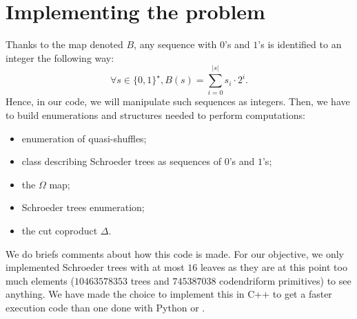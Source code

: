 \documentclass[a4paper,10pt]{amsart}
\newcommand{\Schw}{Schroeder} %
\theoremstyle{definition}
\begin{document}
\section{Implementing the problem} \label{sec:coding}
Thanks to the map denoted $B$, any sequence with $0$'s and $1$'s is identified to an integer the following way:
\[
\forall s\in \{0,1\}^{\star}, B(s)=\sum^{|s|}_{i=0} s_i\cdot 2^i.
\]
Hence, in our code, we will manipulate such sequences as integers. Then, we have to build enumerations and structures needed to perform computations:
\begin{itemize}
	\item enumeration of quasi-shuffles;
	\item class describing \Schw{} trees as sequences of $0$'s and $1$'s;
	\item the $\Omega$ map;
	\item \Schw{} trees enumeration;
	\item the cut coproduct $\Delta$.
\end{itemize}

We do briefs comments about how this code is made. For our objective, we only implemented \Schw{} trees with at most $16$ leaves as they are at this point too much elements ($\num{10463578353}$ trees and $\num{745387038}$ codendriform primitives)  to see anything. We have made the choice to implement this in {\ttfamily C++} to get a faster execution code than one done with {\ttfamily Python} or {\ttfamily \Sage{}}.
\end{document}
